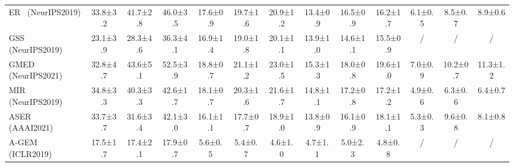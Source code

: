 \begin{table}[t]
\begin{tabular}{l|ccc|ccc|ccc|ccc}
ER~\cite{rolnick2019experience} (NeurIPS2019) & 33.8\scriptsize±3.2& 41.7\scriptsize±2.8                 & 46.0\scriptsize±3.5                 & 17.6\scriptsize±0.9                  & 19.7\scriptsize±1.6                  & 20.9\scriptsize±1.2 & 13.4\scriptsize±0.9                   & 16.5\scriptsize±0.9                  & 16.2\scriptsize±1.7 & 6.1\scriptsize±0.5                   & 8.5\scriptsize±0.7                  & 8.9\scriptsize±0.6\\
GSS~\cite{aljundi2019gradient} (NeurIPS2019) & 23.1\scriptsize±3.9& 28.3\scriptsize±4.6                 & 36.3\scriptsize±4.1                 & 16.9\scriptsize±1.4                  & 19.0\scriptsize±1.8                  & 20.1\scriptsize±1.1 & 13.9\scriptsize±1.0                   & 14.6\scriptsize±1.1                  & 15.5\scriptsize±0.9 & /                   & /                  & /\\
GMED~\cite{jin2021gradient} (NeurIPS2021) & 32.8\scriptsize±4.7& 43.6\scriptsize±5.1                 & 52.5\scriptsize±3.9                 & 18.8\scriptsize±0.7                  & 21.1\scriptsize±1.2                  & 23.0\scriptsize±1.5 & 15.3\scriptsize±1.3                   & 18.0\scriptsize±0.8                  & 19.6\scriptsize±1.0 & 7.0\scriptsize±0.9                   & 10.2\scriptsize±0.7                  & 11.3\scriptsize±1.2\\
MIR~\cite{aljundi2019online} (NeurIPS2019)& 34.8\scriptsize±3.3& 40.3\scriptsize±3.3                 & 42.6\scriptsize±1.7                 & 18.1\scriptsize±0.7                  & 20.3\scriptsize±1.6                  & 21.6\scriptsize±1.7 & 14.8\scriptsize±1.1                   & 17.2\scriptsize±0.8                  & 17.2\scriptsize±1.2 & 4.9\scriptsize±0.6                   & 6.3\scriptsize±0.6                  & 6.4\scriptsize±0.7\\
ASER~\cite{shim2021online} (AAAI2021) & 33.7\scriptsize±3.7& 31.6\scriptsize±3.4                 & 42.1\scriptsize±3.0                 & 16.1\scriptsize±1.1                  & 17.7\scriptsize±0.7                  & 18.9\scriptsize±1.0 & 13.8\scriptsize±0.9                   & 16.1\scriptsize±0.9                  & 18.1\scriptsize±1.1 & 5.3\scriptsize±0.3                   & 9.6\scriptsize±0.8                  & 8.1\scriptsize±0.8\\
A-GEM~\cite{chaudhry2018efficient} (ICLR2019)& 17.5\scriptsize±1.7& 17.4\scriptsize±2.1                 & 17.9\scriptsize±0.7                 & 5.6\scriptsize±0.5                  & 5.4\scriptsize±0.7                  & 4.6\scriptsize±1.0 & 4.7\scriptsize±1.1                   & 5.0\scriptsize±2.3                  & 4.8\scriptsize±0.8 & /                   & /                  & /\\

\end{tabular}
\end{table}
